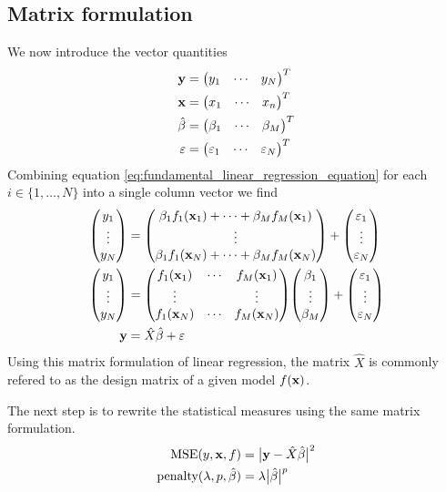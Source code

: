 \documentclass[reprint,english]{revtex4-1}
\begin{document}
\subsection{Matrix formulation}
We now introduce the vector quantities
\begin{subequations}
\begin{align}
\vb{y}&=\mqty(y_1&\cdots&y_N)^T\\
\vb{x}&=\mqty(x_1&\cdots&x_n)^T\\
\hat{\beta}&=\mqty(\beta_1&\cdots&\beta_M)^T\\
\vb{\varepsilon}&=\mqty(\varepsilon_1&\cdots&\varepsilon_N)^T
\end{align}
\end{subequations}
Combining equation \eqref{eq:fundamental_linear_regression_equation} for each \(i\in\{1,\ldots,N\}\) into a single column vector we find
\begin{align*}
\mqty(y_1 \\ \vdots \\ y_N)&=\mqty(\beta_1f_1(\vb{x}_1)+\cdots+\beta_Mf_M(\vb{x}_1) \\ \vdots \\ \beta_1f_1(\vb{x}_N)+\cdots+\beta_Mf_M(\vb{x}_N))+\mqty(\varepsilon_1\\\vdots\\\varepsilon_N)\\
\mqty(y_1 \\ \vdots \\ y_N)&=\mqty(f_1(\vb{x}_1)&\cdots&f_M(\vb{x}_1)\\ \vdots & & \vdots \\ f_1(\vb{x}_N)&\cdots&f_M(\vb{x}_N))\mqty(\beta_1 \\ \vdots \\ \beta_M) + \mqty(\varepsilon_1\\\vdots\\\varepsilon_N)\\
\vb{y}&=\hat{X}\hat{\beta}+\vb{\varepsilon}
\end{align*}
Using this matrix formulation of linear regression, the matrix \(\hat{X}\) is commonly refered to as the design matrix of a given model \(f(\vb{x})\).

The next step is to rewrite the statistical measures using the same matrix formulation.
\begin{align}
\text{MSE}(y,\vb{x},f)&=\big|\vb{y}-\hat{X}\hat{\beta}\big|^2\\
\text{penalty}(\lambda,p,\hat{\beta})&=\lambda\big|\hat{\beta}\big|^p
\end{align}
\end{document}
